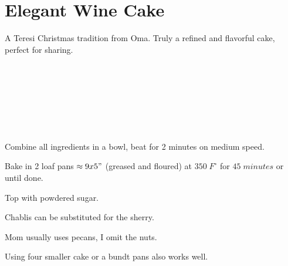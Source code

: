 \section{Elegant Wine Cake}

\begin{recipestats}[
	servings=2 loafs,
	source=Lucille Steinmiller (Oma),
	]
\end{recipestats}

\begin{recipeabstract}
	A Teresi Christmas tradition from Oma.
	Truly a refined and flavorful cake, perfect for sharing.
\end{recipeabstract}

\begin{ingredientcolumns}[1]
	\begin{ingredientblock}
		\\
		\\
		\\
		\\
		\\
		\\
	\end{ingredientblock}
\end{ingredientcolumns}


\begin{preparation}
\item Combine all ingredients in a bowl, beat for 2 minutes on medium speed.
\item Bake in 2 loaf pans $\approx 9x5"$ (greased and floured) at $350\; F^\circ$ for $45\; minutes$ or until done.
\item Top with powdered sugar.
\end{preparation}

\begin{variation}
\item Chablis can be substituted for the sherry.
\item Mom usually uses pecans, I  omit the nuts.
\item Using four smaller cake or a bundt pans also works well.
\end{variation}
\recipeend
